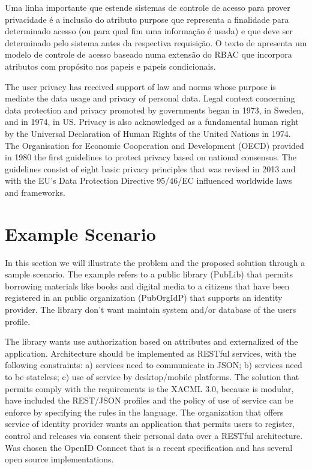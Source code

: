 \documentclass{doublecol-new}
\begin{document}
Uma linha importante que estende sistemas de controle de acesso para prover privacidade é a inclusão do atributo purpose que representa a finalidade para determinado acesso (ou para qual fim uma informação é usada) e que deve ser determinado pelo sistema antes da respectiva requisição. O texto de \cite{byun2005purpose} apresenta um modelo de controle de acesso baseado numa extensão do RBAC que incorpora atributos com propósito nos papeis e papeis condicionais.

The user privacy has received support of law and norms whose purpose is mediate the data usage and privacy of personal data. Legal context concerning data protection and privacy promoted by governments began in 1973, in Sweden, and in 1974, in US. Privacy is also acknowledged as a fundamental human right by the Universal Declaration of Human Rights of the United Nations in 1974. The Organisation for Economic Cooperation and Development (OECD) provided in 1980 the first guidelines to protect privacy based on national consensus. The guidelines consist of eight basic privacy principles that was revised in 2013 and with the EU’s Data Protection Directive 95/46/EC influenced worldwide laws and frameworks.

\section{Example Scenario}

In this section we will illustrate the problem and the proposed solution through a sample scenario. The example refers to a public library (PubLib) that permits borrowing materials like books and digital media to a citizens that have been registered in an public organization (PubOrgIdP) that supports an identity provider. The library don't want maintain system and/or database of the users profile.

The library wants use authorization based on attributes and externalized of the application. Architecture should be implemented as RESTful services, with the following constraints: a) services need to communicate in JSON; b) services need to be stateless; c) use of service by desktop/mobile platforms. The solution that permits comply with the requirements is the XACML 3.0, because is modular, have included the REST/JSON profiles and the policy of use of service can be enforce by specifying the rules in the language. The organization that offers service of identity provider wants an application that permits users to register, control and releases via consent their personal data over a RESTful architecture. Was chosen the OpenID Connect that is a recent specification and has several open source implementations.
\end{document}
